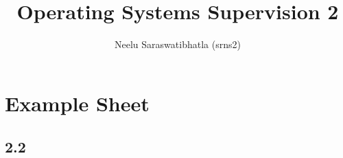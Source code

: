 \documentclass[12pt]{article}
\author{Neelu Saraswatibhatla (srns2)}
\title{Operating Systems Supervision 2}
\date{\vspace{-5ex}}
\begin{document}
\maketitle

\section{Example Sheet}

\subsection*{2.2}
\end{document}
